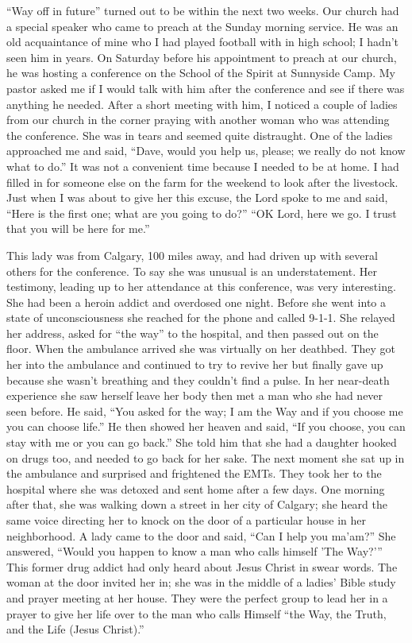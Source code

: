 \documentclass[oneside]{book}
\begin{document}
“Way off in future” turned out to be within the next two weeks. Our church had a special speaker who came to preach at the Sunday morning service. He was an old acquaintance of mine who I had played football with in high school; I hadn't seen him in years. On Saturday before his appointment to preach at our church, he was hosting a conference on the School of the Spirit at Sunnyside Camp. My pastor asked me if I would talk with him after the conference and see if there was anything he needed. After a short meeting with him, I noticed a couple of ladies from our church in the corner praying with another woman who was attending the conference. She  was in tears and seemed quite distraught. One of the ladies approached me and said, “Dave, would you help us, please; we really do not know what to do.” It was not a convenient time because I needed to be at home. I had filled in for someone else on the farm for the weekend to look after the livestock. Just when I was about to give her this excuse, the Lord spoke to me and said, “Here is the first one; what are you going to do?” “OK Lord, here we go. I trust that you will be here for me.” 


This lady was from Calgary, 100 miles away, and had driven up with several others for the conference. To say she was unusual is an understatement. Her testimony, leading up to her attendance at this conference, was very interesting. She had been a heroin addict and overdosed one night. Before she went into a state of unconsciousness she reached for the phone and called 9-1-1. She relayed her address, asked for “the way” to the hospital, and then passed out on the floor. When the ambulance arrived she was virtually on her deathbed. They got her into the ambulance and continued to try to revive her but finally gave up because she wasn't breathing and they couldn’t find a pulse. In her near-death experience she saw herself leave her body then met a man who she had never seen before. He said, “You asked for the way; I am the Way and if you choose me you can choose life.”  He then showed her heaven and said, “If you choose, you can stay with me or you can go back.” She told him that she had a daughter hooked on drugs too, and needed to go back for her sake. The next moment she sat up in the ambulance and surprised and frightened the EMTs. They took her to the hospital where she was detoxed and sent home after a few days. One morning after that, she was walking down a street in her city of Calgary; she heard the same voice directing her to knock on the door of a particular house in her neighborhood. A lady came to the door and said, “Can I help you ma'am?” She answered, “Would you happen to know a man who calls himself 'The Way?’” This former drug addict had only heard about Jesus Christ in swear words. The woman at the door invited her in; she was in the middle of a ladies’ Bible study and prayer meeting at her house. They were the perfect group to lead her in a prayer to give her life over to the man who calls Himself “the Way, the Truth, and the Life (Jesus Christ).”
\end{document}
